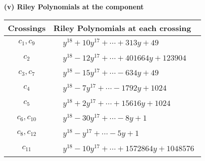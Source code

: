 \documentclass[1p]{elsarticle_modified}
\theoremstyle{definition}
\begin{document}
\newpage\renewcommand{\arraystretch}{1}
\flushleft \textbf{(v) Riley Polynomials at the component}\newline \\
\begin{tabular}{m{50pt}|m{274pt}}
Crossings & \hspace{64pt}Riley Polynomials at each crossing \\
\hline $$\begin{aligned}c_{1},c_{9}\end{aligned}$$&$\begin{aligned}
&y^{18}+10 y^{17}+\cdots+313 y+49
\end{aligned}$\\
\hline $$\begin{aligned}c_{2}\end{aligned}$$&$\begin{aligned}
&y^{18}-12 y^{17}+\cdots+401664 y+123904
\end{aligned}$\\
\hline $$\begin{aligned}c_{3},c_{7}\end{aligned}$$&$\begin{aligned}
&y^{18}-15 y^{17}+\cdots-634 y+49
\end{aligned}$\\
\hline $$\begin{aligned}c_{4}\end{aligned}$$&$\begin{aligned}
&y^{18}-7 y^{17}+\cdots-1792 y+1024
\end{aligned}$\\
\hline $$\begin{aligned}c_{5}\end{aligned}$$&$\begin{aligned}
&y^{18}+2 y^{17}+\cdots+15616 y+1024
\end{aligned}$\\
\hline $$\begin{aligned}c_{6},c_{10}\end{aligned}$$&$\begin{aligned}
&y^{18}-30 y^{17}+\cdots-8 y+1
\end{aligned}$\\
\hline $$\begin{aligned}c_{8},c_{12}\end{aligned}$$&$\begin{aligned}
&y^{18}- y^{17}+\cdots-5 y+1
\end{aligned}$\\
\hline $$\begin{aligned}c_{11}\end{aligned}$$&$\begin{aligned}
&y^{18}-10 y^{17}+\cdots+1572864 y+1048576
\end{aligned}$\\
\hline
\end{tabular}\\~\\
\end{document}
